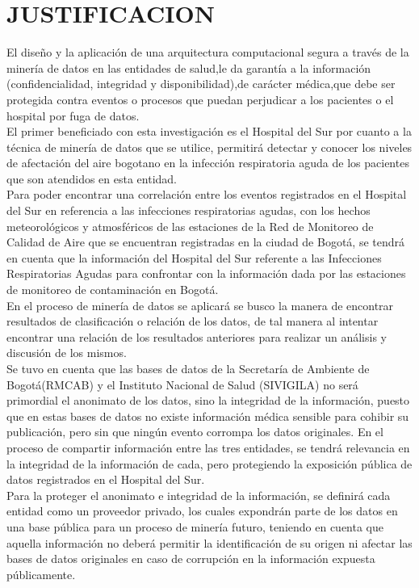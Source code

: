 \documentclass[a4paper,openright,12pt]{book}
\theoremstyle{definition}
\theoremstyle{remark}
\begin{document}
\section{JUSTIFICACION}
El diseño y la aplicación de una arquitectura computacional segura a través de la minería de datos en las entidades de salud,le da garantía a la información (confidencialidad, integridad y disponibilidad),de carácter médica,que debe ser protegida contra eventos o procesos que puedan perjudicar a los pacientes o el hospital por fuga de datos.\\
El primer beneficiado con esta investigación es el Hospital del Sur por cuanto a la técnica de minería de datos que se utilice, permitirá detectar y conocer los niveles de afectación del aire bogotano en la infección respiratoria aguda de los pacientes que son atendidos en esta entidad.\\
Para  poder encontrar una correlación entre los eventos registrados en el Hospital del Sur en referencia a las infecciones respiratorias agudas, con los hechos meteorológicos y atmosféricos de las estaciones de la Red de Monitoreo de Calidad de Aire que se encuentran registradas en la ciudad de Bogotá, se tendrá en cuenta que la información del Hospital del Sur referente a las Infecciones Respiratorias Agudas para confrontar con la información dada por las estaciones de monitoreo de contaminación en Bogotá.\\
En el proceso de minería de datos se aplicará se busco la manera de encontrar resultados de clasificación o relación de los datos, de tal manera al intentar encontrar una relación de los resultados anteriores para realizar un análisis y discusión de los mismos.\\
Se tuvo en cuenta que las bases de datos de la Secretaría de Ambiente de Bogotá(RMCAB) y el Instituto Nacional de Salud (SIVIGILA) no será primordial el anonimato de los datos, sino la integridad de la información, puesto que en estas bases de datos no existe información médica sensible para cohibir su publicación, pero sin que ningún evento corrompa los datos originales. En el proceso de compartir información entre las tres entidades, se tendrá relevancia en la integridad de la información de cada, pero protegiendo la exposición pública de datos registrados en el Hospital del Sur.\\
Para la proteger el anonimato e integridad de la información, se definirá cada entidad como un proveedor privado, los cuales expondrán parte de los datos en una base pública para un proceso de minería futuro, teniendo en cuenta que aquella información no deberá permitir la identificación de su origen ni afectar las bases de datos originales en caso de corrupción en la información expuesta públicamente.\\
\end{document}
